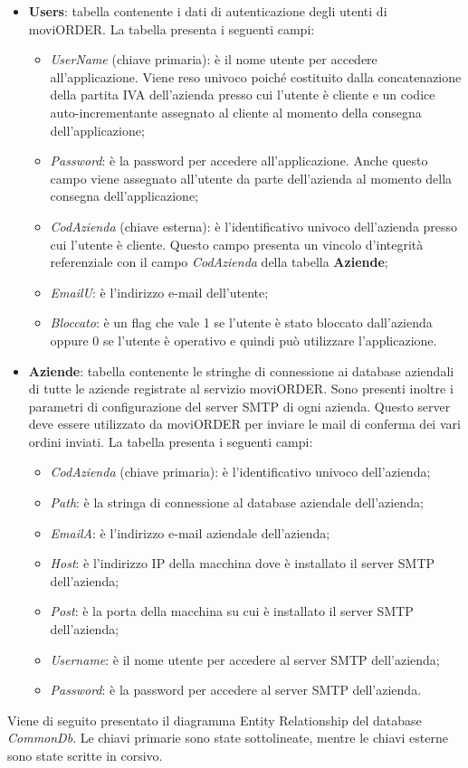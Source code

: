 \begin{itemize}
	\item \textbf{Users}: tabella contenente i dati di autenticazione degli utenti di moviORDER. La tabella presenta i seguenti campi:
		\begin{itemize}
			\item \textit{UserName} (chiave primaria): è il nome utente per accedere all'applicazione. Viene reso univoco poiché costituito dalla concatenazione della partita IVA dell'azienda presso cui l'utente è cliente e un codice auto-incrementante assegnato al cliente al momento della consegna dell'applicazione;
			\item \textit{Password}: è la password per accedere all'applicazione. Anche questo campo viene assegnato all'utente da parte dell'azienda al momento della consegna dell'applicazione;
			\item \textit{CodAzienda} (chiave esterna): è l'identificativo univoco dell'azienda presso cui l'utente è cliente. Questo campo presenta un vincolo d'integrità referenziale con il campo \textit{CodAzienda} della tabella \textbf{Aziende};
			\item \textit{EmailU}: è l'indirizzo e-mail dell'utente;
			\item \textit{Bloccato}: è un flag che vale 1 se l'utente è stato bloccato dall'azienda oppure 0 se l'utente è operativo e quindi può utilizzare l'applicazione.
		\end{itemize}
	\item \textbf{Aziende}: tabella contenente le stringhe di connessione ai database aziendali di tutte le aziende registrate al servizio moviORDER. Sono presenti inoltre i parametri di configurazione del server SMTP di ogni azienda. Questo server deve essere utilizzato da moviORDER per inviare le mail di conferma dei vari ordini inviati. La tabella presenta i seguenti campi:
	\begin{itemize}
		\item \textit{CodAzienda} (chiave primaria): è l'identificativo univoco dell'azienda;
		\item \textit{Path}: è la stringa di connessione al database aziendale dell'azienda;
		\item \textit{EmailA}: è l'indirizzo e-mail aziendale dell'azienda;
		\item \textit{Host}: è l'indirizzo IP della macchina dove è installato il server SMTP dell'azienda;
		\item \textit{Post}: è la porta della macchina su cui è installato il server SMTP dell'azienda;
		\item \textit{Username}: è il nome utente per accedere al server SMTP dell'azienda;
		\item \textit{Password}: è la password per accedere al server SMTP dell'azienda.
	\end{itemize}
\end{itemize}
Viene di seguito presentato il diagramma Entity Relationship del database \textit{CommonDb}. Le chiavi primarie sono state sottolineate, mentre le chiavi esterne sono state scritte in corsivo.


